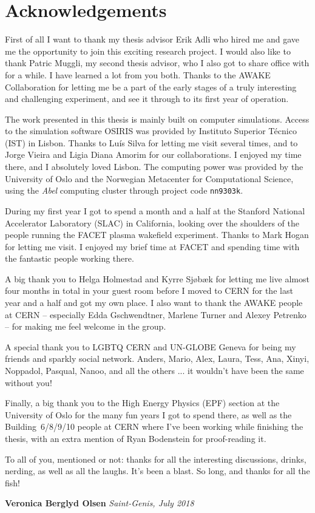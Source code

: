 \chapter*{Acknowledgements}

First of all I want to thank my thesis advisor Erik Adli who hired me and gave me the opportunity to join this exciting research project.
I would also like to thank Patric Muggli, my second thesis advisor, who I also got to share office with for a while.
I have learned a lot from you both.
Thanks to the AWAKE Collaboration for letting me be a part of the early stages of a truly interesting and challenging experiment, and see it through to its first year of operation.

The work presented in this thesis is mainly built on computer simulations.
Access to the simulation software OSIRIS was provided by Instituto Superior Técnico (IST) in Lisbon.
Thanks to Luís Silva for letting me visit several times, and to Jorge Vieira and Ligia Diana Amorim for our collaborations.
I enjoyed my time there, and I absolutely loved Lisbon.
The computing power was provided by the University of Oslo and the Norwegian Metacenter for Computational Science, using the \textit{Abel} computing cluster through project code \texttt{nn9303k}.

During my first year I got to spend a month and a half at the Stanford National Accelerator Laboratory (SLAC) in California, looking over the shoulders of the people running the FACET plasma wakefield experiment.
Thanks to Mark Hogan for letting me visit.
I enjoyed my brief time at FACET and spending time with the fantastic people working there.

A big thank you to Helga Holmestad and Kyrre Sjøbæk for letting me live almost four months in total in your guest room before I moved to CERN for the last year and a half and got my own place.
I also want to thank the AWAKE people at CERN -- especially Edda Gschwendtner, Marlene Turner and Alexey Petrenko -- for making me feel welcome in the group.

A special thank you to LGBTQ CERN and UN-GLOBE Geneva for being my friends and sparkly social network.
Anders, Mario, Alex, Laura, Tess, Ana, Xinyi, Noppadol, Pasqual, Nanoo, and all the others ... it wouldn't have been the same without you!

Finally, a big thank you to the High Energy Physics (EPF) section at the University of Oslo for the many fun years I got to spend there, as well as the Building~6/8/9/10 people at CERN where I've been working while finishing the thesis, with an extra mention of Ryan Bodenstein for proof-reading it.

To all of you, mentioned or not: thanks for all the interesting discussions, drinks, nerding, as well as all the laughs.
It's been a blast.
So long, and thanks for all the fish!

\vfill
\null\hfill\textbf{Veronica Berglyd Olsen}
\newline
\null\hfill\textit{Saint-Genis, July 2018}
